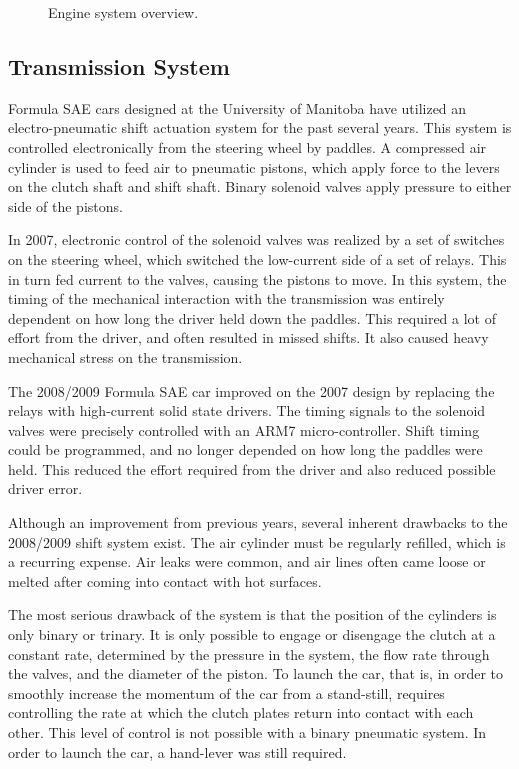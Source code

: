 \begin{figure}[H]
	\centering
		
	\caption{Engine system overview.}
	\label{fig:engine_system_overview}
\end{figure}

\subsection{Transmission System}

Formula SAE cars designed at the University of Manitoba have utilized an electro-pneumatic shift actuation system for the past several years. This system is controlled electronically from the steering wheel by paddles. A compressed air cylinder is used to feed air to pneumatic pistons, which apply force to the levers on the clutch shaft and shift shaft. Binary solenoid valves apply pressure to either side of the pistons. 

In 2007, electronic control of the solenoid valves was realized by a set of switches on the steering wheel, which switched the low-current side of a set of relays. This in turn fed current to the valves, causing the pistons to move. In this system, the timing of the mechanical interaction with the transmission was entirely dependent on how long the driver held down the paddles. This required a lot of effort from the driver, and often resulted in missed shifts. It also caused heavy mechanical stress on the transmission. 

The 2008/2009 Formula SAE car improved on the 2007 design by replacing the relays with high-current solid state drivers. The timing signals to the solenoid valves were precisely controlled with an ARM7 micro-controller. Shift timing could be programmed, and no longer depended on how long the paddles were held. This  reduced the effort required from the driver and also reduced possible driver error.

Although an improvement from previous years, several inherent drawbacks to the 2008/2009 shift system exist. The air cylinder must be regularly refilled, which is a recurring expense. Air leaks were common, and air lines often came loose or melted after coming into contact with hot surfaces. 

The most serious drawback of the system is that the position of the cylinders is only binary or trinary. It is only possible to engage or disengage the clutch at a constant rate, determined by the pressure in the system, the flow rate through the valves, and the diameter of the piston. To launch the car, that is, in order to smoothly increase the momentum of the car from a stand-still, requires controlling the rate at which the clutch plates return into contact with each other. This level of control is not possible with a binary pneumatic system. In order to launch the car, a hand-lever was still required.

